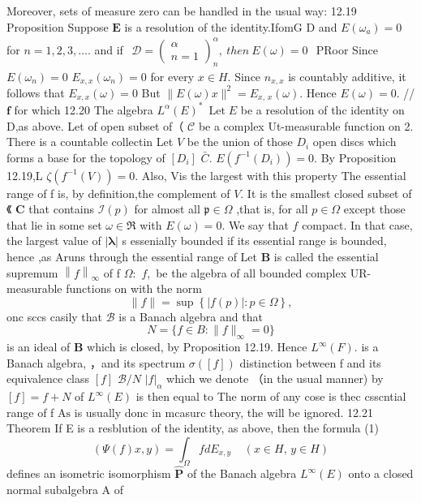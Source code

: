Moreover, sets of measure zero can be handled in the usual way: 12.19 Proposition Suppose ${\boldsymbol{E}}$ is a resolution of the identity.IfomG D and $E(\omega_{a})=0$ for $n=1,2,3,\ldots.$ and if $\begin{array}{l}{{\mathcal{D}=\left(\begin{array}{l}{{\alpha}}\\ {{n=1}}\end{array}\right)_{n}^{\alpha},\ t h e n\ E(\omega)=0}}\end{array}$ PRoor Since $E(\omega_{n})=0$ $E_{x,x}(\omega_{n})=0$ for every $x\in H.$ Since $\scriptstyle n_{x,x}$ is countably additive, it follows that $E_{x,x}(\omega)=0$ But $\|E(\omega)x\|^{2}=E_{x,\,x}(\omega).$ Hence $E(\omega)=0.$ // $\boldsymbol{f}$ for which 12.20 The algebra $L^{\alpha}(E)^{*}\ \operatorname{Let}E$ be a resolution of thc identity on D,as above. Let of open subset of（ $\textstyle{\mathcal{C}}$ be a complex Ut-measurable function on 2. There is a countable collectin Let ${\mathbf{}}V$ be the union of those $D_{i}$ open discs which forms a base for the topology of $\textstyle[D_{i}]$ ${\bar{C}}.$ $E(f^{-1}(D_{i}))=0.$ By Proposition 12.19,L $\zeta(f^{-1}(V))=0.$ Also, Vis the largest with this property The essential range of f is, by definition,the complement of ${\mathit{V}}.$ It is the smallest closed subset of 《 ${\boldsymbol{C}}$ that contains ${\mathcal{I}}(p)$ for almost all ${\mathfrak{p}}\in\Omega$ ,that is, for all $p\in\Omega$ except those that lie in some set $\omega\in\Re$ with $E(\omega)=0.$ We say that $\boldsymbol{\mathit{f}}$ compact. In that case, the largest value of $\left|{\boldsymbol{\lambda}}\right|$ s essenially bounded if its essential range is bounded, hence ,as Aruns through the essential range of Let $\boldsymbol{B}$ is called the essential supremum $\left\|f\right\|_{\infty}$ of f $\Omega{\mathrm{:}}$ $f,$ be the algebra of all bounded complex UR-measurable functions on with the norm $$ \|f\|=\operatorname*{sup}\left\{|f(p)|:p\in\Omega\right\}, $$ onc sccs casily that $\boldsymbol{\mathcal{B}}$ is a Banach algebra and that $$ N=\{f\in B\colon\|f\|_{\infty}=0\} $$ is an ideal of $\boldsymbol{B}$ which is closed, by Proposition 12.19. Hence $L^{\infty}(F).$ is a Banach algebra, ，and its spectrum $\sigma([f])$ distinction between f and its equivalence class $[f]$ ${\mathcal{B}}/N$ $|f|_{\alpha}$ which we denote （in the usual manner) by $[f]=f+N$ of $L^{\infty}(E)$ is then equal to The norm of any cose is thec csscntial range of f $\mathrm{A}\mathrm{s}$ is usually donc in mcasurc theory, the will be ignored. 12.21 Theorem If E is a resblution of the identity, as above, then the formula (1) $$ (\Psi(f)x,y)=\int_{\Omega}f d E_{x,y}\ \ \ \ \ (x\in H,\,y\in H) $$ defines an isometric isomorphism $\mathbf{\hat{P}}$ of the Banach algebra $L^{\infty}(E)$ onto a closed normal subalgebra A of %